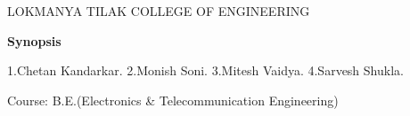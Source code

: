 



\newpage
\thispagestyle{empty}

\begin{center}
	\Large{LOKMANYA TILAK COLLEGE OF ENGINEERING}
	\vspace{0.5cm}
	\vspace{0.5cm}
	\vspace{0.5cm}
\end{center}
\vspace{0.4cm}

\begin{center}
	\huge \textbf{Synopsis}
\end{center}

\vspace{0.2cm}
\begin{center}
	
	1.Chetan Kandarkar.
	\linebreak	2.Monish Soni.
	\linebreak	3.Mitesh Vaidya.
	\linebreak	4.Sarvesh Shukla.
\end{center}

\vspace{1cm}
\begin{flushleft}{Course: B.E.(Electronics \& Telecommunication Engineering)}
	\vspace{0.5cm}
	\vspace{0.5cm} 
	\vspace{0.5cm}
\end{flushleft}

